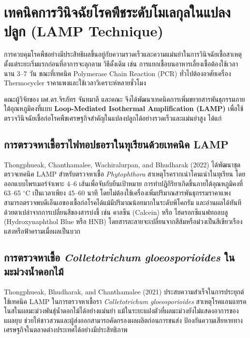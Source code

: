 \section{เทคนิคการวินิจฉัยโรคพืชระดับโมเลกุลในแปลงปลูก (LAMP Technique)}

การควบคุมโรคพืชอย่างมีประสิทธิผลขึ้นอยู่กับความรวดเร็วและความแม่นยำในการวินิจฉัยเชื้อสาเหตุตั้งแต่ระยะเริ่มแรกก่อนที่อาการจะลุกลาม วิธีดั้งเดิม เช่น การแยกเชื้อบนอาหารเลี้ยงเชื้อต้องใช้เวลานาน 3--7 วัน ขณะที่เทคนิค Polymerase Chain Reaction (PCR) ทั่วไปต้องอาศัยเครื่อง Thermocycler ราคาแพงและใช้เวลาวิเคราะห์หลายชั่วโมง

คณะผู้วิจัยของ ผศ.ดร.จิรภัทร จันทมาลี และคณะ จึงได้พัฒนาเทคนิคการเพิ่มขยายสารพันธุกรรมภายใต้อุณหภูมิคงที่แบบ \textbf{Loop-Mediated Isothermal Amplification (LAMP)} เพื่อใช้ตรวจวินิจฉัยเชื้อก่อโรคพืชเศรษฐกิจสำคัญในแปลงปลูกได้อย่างรวดเร็วและแม่นยำสูง ได้แก่

\subsection{การตรวจหาเชื้อราไฟทอปธอราในทุเรียนด้วยเทคนิค LAMP}
Thongphueak, Chanthamalee, Wachiralurpan, and Bhudharak (2022) ได้พัฒนาชุดตรวจเทคนิค LAMP สำหรับตรวจหาเชื้อ \textit{Phytophthora} สาเหตุโรครากเน่าโคนเน่าในทุเรียน โดยออกแบบไพรเมอร์จำเพาะ 4--6 เส้นเพื่อจับกับยีนเป้าหมาย การทำปฏิกิริยาเกิดขึ้นภายใต้อุณหภูมิคงที่ 63--65 $^{\circ}\text{C}$ เป็นเวลาเพียง 45--60 นาที โดยไม่ต้องใช้เครื่องเพิ่มปริมาณสารพันธุกรรมราคาแพง สามารถตรวจพบดีเอ็นเอของเชื้อก่อโรคได้แม้มีปริมาณน้อยมากในระดับพิโคกรัม และอ่านผลได้ทันทีด้วยตาเปล่าจากการเปลี่ยนสีของสารบ่งชี้ เช่น คาลซีน (Calcein) หรือ ไฮดรอกซีแนฟทอลบลู (Hydroxynaphthol Blue หรือ HNB) โดยสารละลายจะเปลี่ยนจากสีส้มหรือม่วงเป็นสีเขียวเรืองแสงหรือฟ้าครามเมื่อผลเป็นบวก

\subsection{การตรวจหาเชื้อ \textit{Colletotrichum gloeosporioides} ในมะม่วงน้ำดอกไม้}
Thongphueak, Bhudharak, and Chanthamalee (2021) ประสบความสำเร็จในการประยุกต์ใช้เทคนิค LAMP ในการตรวจหาเชื้อรา \textit{Colletotrichum gloeosporioides} สาเหตุโรคแอนแทรคโนสในผลมะม่วงพันธุ์น้ำดอกไม้ได้อย่างแม่นยำ แม้ในระยะแฝงตัวที่ผลมะม่วงยังไม่แสดงอาการของแผลยุบ ช่วยให้ชาวสวนและผู้ส่งออกสามารถคัดกรองผลผลิตก่อนการขนส่ง ป้องกันความเสียหายทางเศรษฐกิจในตลาดต่างประเทศได้อย่างมีประสิทธิภาพ

